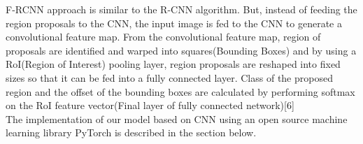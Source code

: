 \documentclass[12pt]{article}
\begin{document}
F-RCNN approach is similar to the R-CNN algorithm. But, instead of feeding the region proposals to the CNN, the input image is fed to the CNN to generate a convolutional feature map. From the convolutional feature map, region of proposals are identified and warped into squares(Bounding Boxes) and by using a RoI(Region of Interest) pooling layer, region proposals are reshaped into fixed sizes so that it can be fed into a fully connected layer. Class of the proposed region and the offset of the bounding boxes are calculated by performing softmax on the RoI feature vector(Final layer of fully connected network)[6] \\ 

The implementation of our model based on CNN using an open source machine learning library PyTorch is described in the section below. 

\newpage
\end{document}
